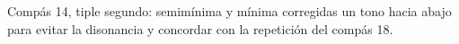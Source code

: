 \noindent Compás 14, tiple segundo: semimínima y mínima corregidas un tono hacia abajo para evitar la disonancia y concordar con la repetición del compás 18. 
